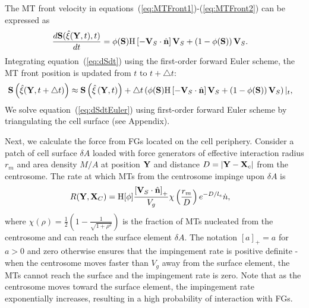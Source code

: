 \documentclass[11pt]{article}
\begin{document}
The MT front velocity in equations~(\ref{eq:MTFront1})-(\ref{eq:MTFront2}) 
can be expressed as
\begin{align}
\label{eq:dSdt}
    \frac{d {\bf S}(\hat\xi({\bf Y}, t),t)}{dt} &= \phi({\bf S}) \mbox{H}\left[-{\bf V}_S\cdot\hat {\bf n}\right]{\bf V}_S + \left(1-\phi({\bf S})\right){\bf V}_S.
\end{align}
Integrating equation~(\ref{eq:dSdt})  using the first-order forward Euler scheme, the MT front position is updated from $t$ to $t+\triangle t$:
\begin{align}
\label{eq:dSdtEuler}
    {\bf S}\left(\hat\xi({\bf Y}, t+\triangle  t)\right) & \approx {\bf S}\left(\hat\xi\left({\bf Y}, t\right)\right) + \triangle t\left(\phi({\bf S}) \mbox{H}\left[-{\bf V}_S\cdot\hat {\bf n}\right]{\bf V}_S + \left(1-\phi({\bf S})\right){\bf V}_S\right)|_t,
\end{align}
We solve equation~(\ref{eq:dSdtEuler}) using first-order 
forward Euler scheme by triangulating the cell surface (see Appendix).

Next, we calculate the force from FGs located on the cell periphery. Consider a patch of cell surface $\delta A$ 
loaded with force generators of effective interaction radius $r_m$ and area density $M/A$ at position ${\bf Y}$
and distance $D = |{\bf Y}-{\bf X}_c|$ from the centrosome. The rate at which MTs from the centrosome impinge upon $\delta A$ is 
\begin{align}
\label{eq:impingement_rate_3d}
R({\bf Y},{\bf X}_C) &= \mbox{H}[\phi]\frac{\left[{\bf V}_S\cdot\hat{\bf n} \right]_+}{V_g} \chi\left(\frac{r_m}{D}\right)e^{- D/l_e}\dot n,
\end{align}
where 
$\chi\left(\rho\right) = \frac{1}{2}\left(1-\frac{1}{\sqrt{1+\rho^2}}\right)$ is the fraction of MTs nucleated from the centrosome and can reach the surface element $\delta A$.
The notation $[a]_+=a$ for $a>0$ and  zero otherwise ensures that the impingement rate is positive definite - when the centrosome moves faster than $V_g$ away from the surface element, the MTs cannot reach the surface and the impingement rate is zero.
Note that as  the centrosome moves toward the surface element, the impingement rate exponentially increases, resulting in a high probability of interaction with FGs.
\end{document}
